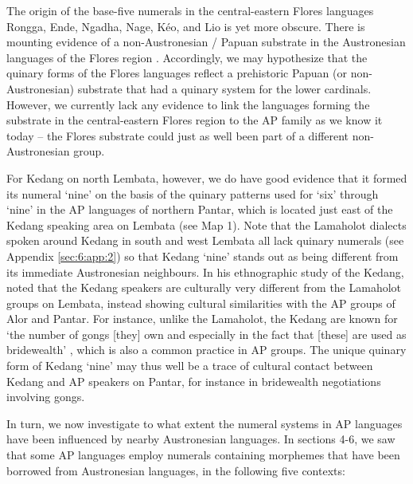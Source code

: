 The origin of the base-five numerals in the central-eastern Flores languages Rongga, Ende, Ngadha, Nage, K\'eo, and Lio is yet more obscure. There is mounting evidence of a non-Austronesian / Papuan substrate in the Austronesian languages of the Flores region \citep[see, e.g.,][]{Capell1976,Klamer2012}. Accordingly, we may hypothesize that the quinary forms of the Flores languages reflect a prehistoric Papuan (or non-Austronesian) substrate that had a quinary system for the lower cardinals. However, we currently lack any evidence to link the languages forming the substrate in the central-eastern Flores region to the AP family as we know it today -- the Flores substrate could just as well been part of a different non-Austronesian group. 

For Kedang on north Lembata, however, we do have good evidence that it formed its numeral `nine' on the basis of the quinary patterns used for `six' through `nine' in the AP languages of northern Pantar, which is located just east of the Kedang speaking area on Lembata (see Map 1). Note that the Lamaholot dialects spoken around Kedang in south and west Lembata all lack quinary numerals (see Appendix \ref{sec:6:app:2}) so that Kedang `nine' stands out as being different from its immediate Austronesian neighbours. In his ethnographic study of the Kedang, \citet{Barnes1974} noted that the Kedang speakers are culturally very different from the Lamaholot groups on Lembata, instead showing cultural similarities with the AP groups of Alor and Pantar. For instance, unlike the Lamaholot, the Kedang are known for `the number of gongs [they] own and especially in the fact that [these] are used as bridewealth' \citep[15]{Barnes1974}, which is also a common practice in AP groups. The unique quinary form of Kedang `nine' may thus well be a trace of cultural contact between Kedang and AP speakers on Pantar, for instance in bridewealth negotiations involving gongs.{} 

In turn, we now investigate to what extent the numeral systems in AP languages have been influenced by nearby Austronesian languages. In sections 4-6, we saw that some AP languages employ numerals containing morphemes that have been borrowed from Austronesian languages, in the following five contexts: 


